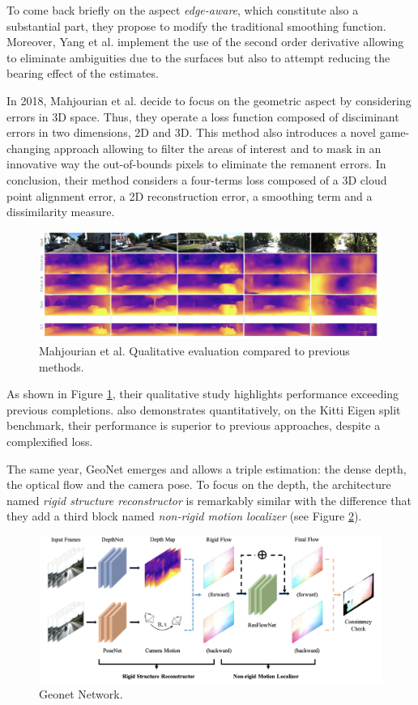 To come back briefly on the aspect \emph{edge-aware}, which constitute also a substantial part, they propose to modify the traditional smoothing function. Moreover, Yang et al. implement the use of the second order derivative allowing to eliminate ambiguities due to the surfaces but also to attempt reducing the bearing effect of the estimates.


In 2018, Mahjourian et al.\cite{mahjourian2018unsupervised} decide to focus on the geometric aspect by considering errors in 3D space. Thus, they operate a loss function composed of disciminant errors in two dimensions, 2D and 3D. 
This method also introduces a novel game-changing approach allowing to filter the areas of interest and to mask in an innovative way the out-of-bounds pixels to eliminate the remanent errors. In conclusion, their method considers a four-terms loss composed of a 3D cloud point alignment error, a 2D reconstruction error, a smoothing term and a dissimilarity measure.

\begin{figure}[h]
	\centering
	\includegraphics[width=0.8\linewidth]{Figures/SOA/mahjourian-illu}
	\caption[Mahjourian et al. Qualitative evaluation compared to previous methods..]{Mahjourian et al.\cite{mahjourian2018unsupervised} Qualitative evaluation compared to previous methods.}
	\label{mahjourian-illu}
\end{figure}


As shown in Figure \ref{mahjourian-illu}, their qualitative study highlights performance exceeding previous completions. \cite{mahjourian2018unsupervised} also demonstrates quantitatively, on the Kitti Eigen split benchmark, their performance is superior to previous approaches, despite a complexified loss.


The same year, GeoNet \cite{yin2018geonet} emerges and allows a triple estimation: the dense depth, the optical flow and the camera pose. To focus on the depth, the architecture named \emph{rigid structure reconstructor} is remarkably similar with the difference that they add a third block named \emph{non-rigid motion localizer} (see Figure \ref{geonet}).

\begin{figure}[h]
	\centering
	\includegraphics[width=0.8\linewidth]{Figures/SOA/geonet}
	\caption[Geonet Network.]{Geonet \cite{yin2018geonet} Network.}
	\label{geonet}
\end{figure}


